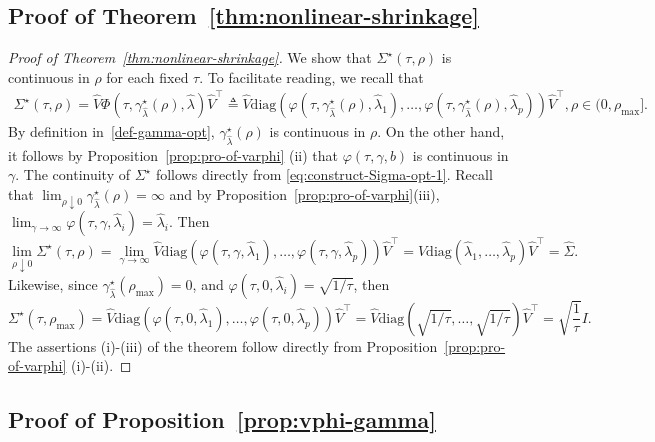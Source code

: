 \documentclass[11pt]{article}
\newcommand{\opt}{^\star}
\newcommand{\Let}{\triangleq}
\def\diag{\mathrm{diag}}
\def\transpose{\top}
\newcommand{\wh}{\widehat}
\begin{document}
\subsection{Proof of Theorem~\ref{thm:nonlinear-shrinkage}}
\begin{proof}[Proof of Theorem~\ref{thm:nonlinear-shrinkage}]
We show that $\Sigma\opt(\tau, \rho)$ is continuous in $\rho$ for each fixed $\tau$. To facilitate reading, we recall that
\begin{align}\label{eq:construct-Sigma-opt-1}
    \Sigma\opt(\tau,  \rho)=\widehat{V}\Phi(\tau, \gamma_{\wh\lambda}\opt( \rho), \widehat{\lambda})\widehat{V}^\transpose\Let\wh V \diag(\varphi(\tau, \gamma_{\wh\lambda}\opt( \rho), \widehat{\lambda}_1), \ldots ,\varphi(\tau, \gamma_{\wh\lambda}\opt( \rho), \widehat{\lambda}_p))\wh V^\transpose,  \rho\in (0,  \rho_{\max}].
\end{align}
By definition in~\eqref{def-gamma-opt}, $\gamma_{\wh\lambda}\opt(\rho)$ is continuous in $\rho$. On the other hand, it follows by  Proposition~\ref{prop:pro-of-varphi} (ii) that  $\varphi(\tau,\gamma,b)$ is continuous in $\gamma$. The continuity of $\Sigma\opt$ follows directly from \eqref{eq:construct-Sigma-opt-1}.
Recall that $\lim_{\rho\downarrow 0}\gamma_{\wh\lambda}\opt(\rho) = \infty$ and by Proposition~\ref{prop:pro-of-varphi}(iii), $\lim_{\gamma\to\infty} \varphi(\tau, \gamma, \widehat{\lambda}_i) = \widehat{\lambda}_i$. Then
\[
    \lim_{ \rho\downarrow 0}\Sigma\opt(\tau, \rho) = \lim_{\gamma\to\infty}\wh V \diag(\varphi(\tau, \gamma, \widehat{\lambda}_1), \ldots ,\varphi(\tau, \gamma, \widehat{\lambda}_p))\wh V^\transpose =\wh V \diag(\wh\lambda_1,\ldots,\wh\lambda_p)\wh V^\transpose =\wh\Sigma.
\]
Likewise, since $\gamma_{\wh\lambda}\opt(\rho_{\max}) = 0$, and $\varphi(\tau,0,\wh\lambda_i)=\sqrt{1/\tau}$, then
\[
    \Sigma\opt(\tau, \rho_{\max}) = \wh V \diag(\varphi(\tau, 0, \widehat{\lambda}_1), \ldots ,\varphi(\tau, 0, \widehat{\lambda}_p))\wh V^\transpose =\wh V \diag(\sqrt{1/\tau},\ldots,\sqrt{1/\tau})\wh V^\transpose = \sqrt{\frac{1}{\tau}} I.
\]
The assertions (i)-(iii) of the theorem follow directly from Proposition~\ref{prop:pro-of-varphi} (i)-(ii).
\end{proof}

\subsection{Proof of Proposition~\ref{prop:vphi-gamma}}
\end{document}
